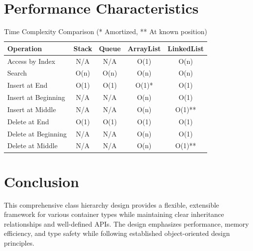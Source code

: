 \documentclass[12pt,a4paper]{article}
\begin{document}
\section{Performance Characteristics}
\begin{table}[h!]
\centering
\begin{tabular}{|l|c|c|c|c|}
\hline
\textbf{Operation} & \textbf{Stack} & \textbf{Queue} & \textbf{ArrayList} & \textbf{LinkedList} \\
\hline
Access by Index & N/A & N/A & O(1) & O(n) \\
Search & O(n) & O(n) & O(n) & O(n) \\
Insert at End & O(1) & O(1) & O(1)* & O(1) \\
Insert at Beginning & N/A & N/A & O(n) & O(1) \\
Insert at Middle & N/A & N/A & O(n) & O(1)** \\
Delete at End & O(1) & O(1) & O(1) & O(1) \\
Delete at Beginning & N/A & N/A & O(n) & O(1) \\
Delete at Middle & N/A & N/A & O(n) & O(1)** \\
\hline
\end{tabular}
\caption{Time Complexity Comparison (* Amortized, ** At known position)}
\label{tab:performance}
\end{table}

\section{Conclusion}

This comprehensive class hierarchy design provides a flexible, extensible framework for various container types while maintaining clear inheritance relationships and well-defined APIs. The design emphasizes performance, memory efficiency, and type safety while following established object-oriented design principles.
\end{document}
